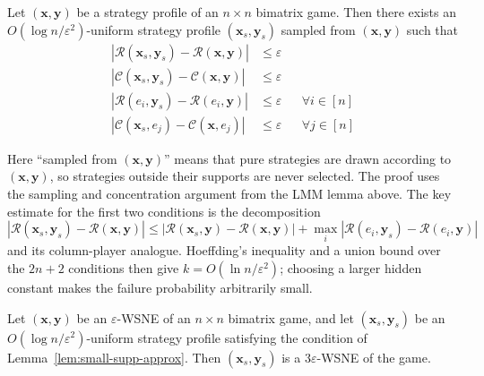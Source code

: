 \begin{lemma}
  \label{lem:small-supp-approx}
  Let \((\mathbf{x}, \mathbf{y})\) be a strategy profile of an \(n \times n\) bimatrix game. Then there exists an \(O(\log n / \varepsilon^2)\)-uniform strategy profile \((\mathbf{x}_s, \mathbf{y}_s)\) sampled from \((\mathbf{x}, \mathbf{y})\) such that
  \begin{align*}
    |\mathcal{R}(\mathbf{x}_s, \mathbf{y}_s) - \mathcal{R}(\mathbf{x}, \mathbf{y})| & \le \varepsilon                        \\
    |\mathcal{C}(\mathbf{x}_s, \mathbf{y}_s) - \mathcal{C}(\mathbf{x}, \mathbf{y})| & \le \varepsilon                        \\
    |\mathcal{R}(e_i, \mathbf{y}_s) - \mathcal{R}(e_i, \mathbf{y})|                 & \le \varepsilon &  & \forall i \in [n] \\
    |\mathcal{C}(\mathbf{x}_s, e_j) - \mathcal{C}(\mathbf{x}, e_j)|                 & \le \varepsilon &  & \forall j \in [n]
  \end{align*}
\end{lemma}

Here ``sampled from \((\mathbf{x}, \mathbf{y})\)'' means that pure strategies are drawn according to \((\mathbf{x}, \mathbf{y})\), so strategies outside their supports are never selected. The proof uses the sampling and concentration argument from the LMM lemma above. The key estimate for the first two conditions is the decomposition
\[
  |\mathcal{R}(\mathbf{x}_s, \mathbf{y}_s) - \mathcal{R}(\mathbf{x}, \mathbf{y})| \le |\mathcal{R}(\mathbf{x}_s, \mathbf{y}) - \mathcal{R}(\mathbf{x}, \mathbf{y})| + \max_{i} |\mathcal{R}(e_i, \mathbf{y}_s) - \mathcal{R}(e_i, \mathbf{y})|
\]
and its column-player analogue. Hoeffding's inequality and a union bound over the \(2n+2\) conditions then give \(k=O(\ln n/\varepsilon^2)\); choosing a larger hidden constant makes the failure probability arbitrarily small.

\begin{lemma}
  \label{lem:3_eps-wsne-sampling}
  Let \((\mathbf{x}, \mathbf{y})\) be an \(\varepsilon\)-WSNE of an \(n \times n\) bimatrix game, and let \((\mathbf{x}_s, \mathbf{y}_s)\) be an \(O(\log n / \varepsilon^2)\)-uniform strategy profile satisfying the condition of Lemma~\ref{lem:small-supp-approx}. Then \((\mathbf{x}_s, \mathbf{y}_s)\) is a \(3\varepsilon\)-WSNE of the game.
\end{lemma}

